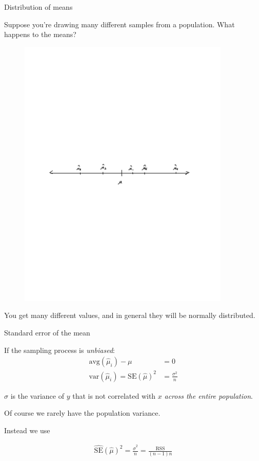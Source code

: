 \documentclass[aspectratio=169]{beamer}
\begin{document}
\begin{frame}{Distribution of means}

Suppose you're drawing many different samples from a population.  What happens to the means?
\pause
\begin{figure}
\includegraphics[width=0.9\textwidth]{pop-sample-mean}
\end{figure}

You get many different values, and in general they will be normally distributed.

\end{frame}

\begin{frame}{Standard error of the mean}

If the sampling process is \textit{unbiased}:
\begin{align*}
\text{avg}(\hat{\mu}_i) - \mu &= 0\\
\text{var}(\hat{\mu}_i) = \text{SE}(\hat{\mu})^2 &= \frac{\sigma^2}{n}
\end{align*}

$\sigma$ is the variance of $y$ that is not correlated with $x$ \textit{across the entire population}.

\vspace{5mm}

Of course we rarely have the population variance.  

\vspace{5mm}

Instead we use

\begin{align*}
\hat{\text{SE}}(\hat{\mu})^2 = \frac{\hat{\sigma}^2}{n} = \frac{\text{RSS}}{(n-1)n}
\end{align*}

\end{frame}
\end{document}
